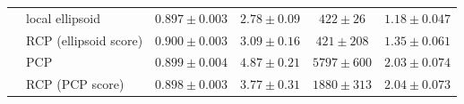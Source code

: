 \begin{table}[!t]
{\begin{tabular}{llcccc}
 & local ellipsoid & $0.897${\scriptsize${}\pm0.003$} & $2.78${\scriptsize${}\pm0.09$} & $422${\scriptsize${}\pm26$} & $1.18${\scriptsize${}\pm0.047$}\\
 & RCP (ellipsoid score) & $0.900${\scriptsize${}\pm0.003$} & $3.09${\scriptsize${}\pm0.16$} & $421${\scriptsize${}\pm208$} & $1.35${\scriptsize${}\pm0.061$}\\
 & PCP & $0.899${\scriptsize${}\pm0.004$} & $4.87${\scriptsize${}\pm0.21$} & $5797${\scriptsize${}\pm600$} & $2.03${\scriptsize${}\pm0.074$}\\
 & RCP (PCP score) & $0.898${\scriptsize${}\pm0.003$} & $3.77${\scriptsize${}\pm0.31$} & $1880${\scriptsize${}\pm313$} & $2.04${\scriptsize${}\pm0.073$}\\
\bottomrule
\end{tabular}}
\end{table}
